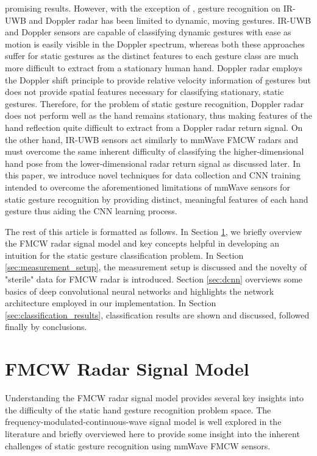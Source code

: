 \documentclass{ieeeaccess}
\begin{document}
promising results. However, with the exception of \cite{static_gesture_recognition:time_domain}, gesture recognition on IR-UWB and Doppler radar has been limited to dynamic, moving gestures. IR-UWB and Doppler sensors are capable of classifying dynamic gestures with ease as motion is easily visible in the Doppler spectrum, whereas both these approaches suffer for static gestures as the distinct features to each gesture class are much more difficult to extract from a stationary human hand. Doppler radar employs the Doppler shift principle to provide relative velocity information of gestures but does not provide spatial features necessary for classifying stationary, static gestures. Therefore, for the problem of static gesture recognition, Doppler radar does not perform well as the hand remains stationary, thus making features of the hand reflection quite difficult to extract from a Doppler radar return signal. On the other hand, IR-UWB sensors act similarly to mmWave FMCW radars and must overcome the same inherent difficulty of classifying the higher-dimensional hand pose from the lower-dimensional radar return signal as discussed later. In this paper, we introduce novel techniques for data collection and CNN training intended to overcome the aforementioned limitations of mmWave sensors for static gesture recognition by providing distinct, meaningful features of each hand gesture thus aiding the CNN learning process.

The rest of this article is formatted as follows. In Section \ref{sec:fmcw_radar}, we briefly overview the FMCW radar signal model and key concepts helpful in developing an intuition for the static gesture classification problem. In Section \ref{sec:measurement_setup}, the measurement setup is discussed and the novelty of "sterile" data for FMCW radar is introduced. Section \ref{sec:dcnn} overviews some basics of deep convolutional neural networks and highlights the network architecture employed in our implementation. In Section \ref{sec:classification_results}, classification results are shown and discussed, followed finally by conclusions.

\section{FMCW Radar Signal Model}
\label{sec:fmcw_radar}
Understanding the FMCW radar signal model provides several key insights into the difficulty of the static hand gesture recognition problem space. The frequency-modulated-continuous-wave signal model is well explored in the literature \cite{josiah:isar} and briefly overviewed here to provide some insight into the inherent challenges of static gesture recognition using mmWave FMCW sensors.
\end{document}
